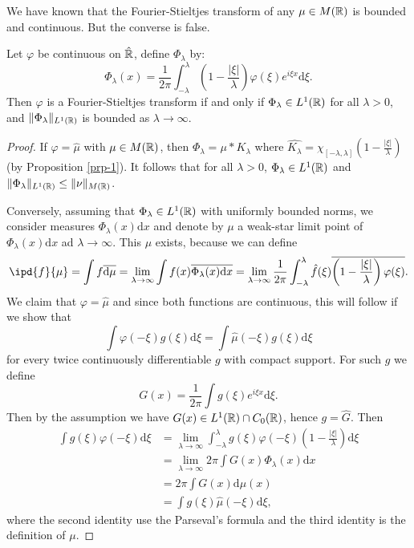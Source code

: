 We have known that the Fourier-Stieltjes transform of any $\mu \in M(\mathbb{R})$ is bounded and continuous. But the converse is false.
\begin{theorem}
  Let $\varphi$ be continuous on $\hat{\mathbb{R}}$, define $\Phi_\lambda$ by:
  \[
    \Phi_\lambda(x)=\frac{1}{2\pi}\int_{-\lambda}^{\lambda}\left( 1-\frac{|\xi|}{\lambda}\right)\varphi(\xi)e^{i\xi x} \mathrm{d}\xi.
  \] 
  Then $\varphi$ is a Fourier-Stieltjes transform if and only if $\Phi_\lambda \in L^{1}(\mathbb{R})$ for all $\lambda>0$, and $\|\Phi_\lambda\|_{L^{1}(\mathbb{R})}$ is bounded as $\lambda\to \infty$.
\end{theorem}
\begin{proof}
  If $\varphi=\hat{\mu}$ with $\mu \in M(\mathbb{R})$, then $\Phi_\lambda=\mu*K_\lambda$ where $\widehat{K_\lambda}=\chi_{[-\lambda,\lambda]}\left( 1-\frac{|\xi|}{\lambda} \right) $ (by Proposition \ref{prp-1}). It follows that for all $\lambda>0$, $\Phi_\lambda \in L^1(\mathbb{R})$ and $\|\Phi_\lambda\|_{L^{1}(\mathbb{R})}\le \|\nu\|_{M(\mathbb{R})}$.

  Conversely, assuming that $\Phi_\lambda \in  L^{1}(\mathbb{R})$ with uniformly bounded norms, we consider measures $\Phi_{\lambda}(x) \mathrm{d}x$ and denote by $\mu$ a weak-star limit point of $\Phi_\lambda(x) \mathrm{d}x$ ad $\lambda\to \infty$. This $\mu$ exists, because we can define
  \[
    \ipd{f}{\mu}=\int f \overline{\mathrm{d}\mu}=\lim_{\lambda\to \infty} \int f(x)\overline{\Phi_\lambda(x)\mathrm{d}x}=\lim_{\lambda\to \infty}\frac{1}{2\pi} \int_{-\lambda}^{\lambda}\hat{f}(\xi)\overline{\left( 1-\frac{|\xi|}{\lambda} \right) \varphi(\xi)}.
  \]
  We claim that $\varphi=\hat{\mu}$ and since both functions are continuous, this will follow if we show that 
  \[
    \int\varphi(-\xi)g(\xi)\mathrm{d}\xi=\int \hat{\mu}(-\xi)g(\xi)\mathrm{d}\xi
  \] for every twice continuously differentiable $g$ with compact support. For such $g$ we define
  \[
    G(x)=\frac{1}{2\pi}\int g(\xi)e^{i\xi x}\mathrm{d}\xi.
  \] 
  Then by the assumption we have $G(x) \in L^{1}(\mathbb{R})\cap C_0(\mathbb{R})$, hence $g=\hat{G}$. Then 
  \begin{align*}
    \int g(\xi)\varphi(-\xi)\mathrm{d}\xi &= \lim_{\lambda\to \infty}\int_{-\lambda}^{\lambda}g(\xi)\varphi(-\xi)\left( 1-\frac{|\xi|}{\lambda} \right) \mathrm{d}\xi\\
    &= \lim_{\lambda\to \infty}2\pi \int G(x) \Phi_{\lambda}(x)\mathrm{d}x\\
    &=2\pi \int G(x)\mathrm{d}\mu(x)\\
    &= \int g(\xi)\hat{\mu}(-\xi)\mathrm{d}\xi
  ,\end{align*}
  where the second identity use the Parseval's formula and the third identity is the definition of $\mu$.
\end{proof}

